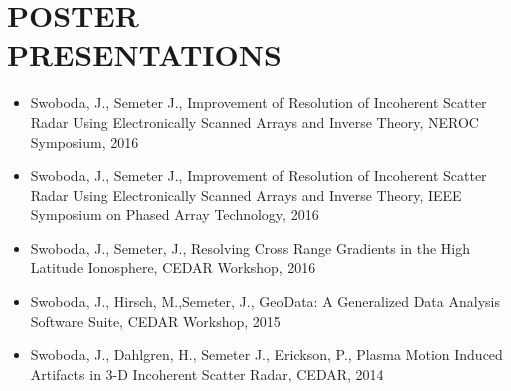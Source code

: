\section*{POSTER \\ PRESENTATIONS}
\begin{itemize}
\item Swoboda, J., Semeter J., Improvement of Resolution of Incoherent Scatter Radar Using Electronically Scanned Arrays and Inverse Theory, NEROC Symposium, 2016
\item Swoboda, J., Semeter J., Improvement of Resolution of Incoherent Scatter Radar Using Electronically Scanned Arrays and Inverse Theory, IEEE Symposium on Phased Array Technology, 2016
\item Swoboda, J.,  Semeter, J., Resolving Cross Range Gradients in the High Latitude Ionosphere, CEDAR Workshop, 2016
\item Swoboda, J., Hirsch, M.,Semeter, J., GeoData: A Generalized Data Analysis Software Suite, CEDAR Workshop, 2015
\item Swoboda, J., Dahlgren, H., Semeter J., Erickson, P., Plasma Motion Induced Artifacts in 3-D Incoherent Scatter Radar, CEDAR, 2014
\end{itemize}
